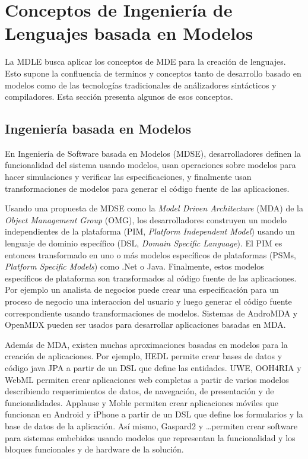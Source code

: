 

\section{Conceptos de Ingeniería de Lenguajes basada en Modelos}
\label{sec:conceptos}

La MDLE busca aplicar los conceptos de MDE para la creación de lenguajes.
Esto supone la confluencia de terminos y conceptos tanto de desarrollo basado en modelos como de las tecnologías tradicionales de análizadores sintácticos y compiladores.
Esta sección presenta algunos de esos conceptos.

\subsection{Ingeniería basada en Modelos}

En Ingeniería de Software basada en Modelos (MDSE), desarrolladores definen la funcionalidad del sistema usando modelos, 
usan operaciones sobre modelos para hacer simulaciones y verificar las especificaciones, 
y finalmente usan transformaciones de modelos para generar el código fuente de las aplicaciones.

Usando una propuesta de MDSE como la \textit{Model Driven Architecture} (MDA) de la \textit{Object Management Group} (OMG), 
los desarrolladores construyen un modelo independientes de la plataforma (PIM, \textit{Platform Independent Model})
usando un  lenguaje de dominio específico (DSL, \textit{Domain Specific Language}).
El PIM es entonces transformado en uno o más modelos específicos de plataformas (PSMs, \textit{Platform Specific Models}) como .Net o Java.
Finalmente, estos modelos específicos de plataforma son transformados al código fuente de las aplicaciones. 
Por ejemplo un analista de negocios puede crear una especificación para un proceso de negocio una interaccion del usuario y luego generar el código fuente correspondiente usando transformaciones de modelos.
Sistemas de AndroMDA y OpenMDX pueden ser usados para desarrollar aplicaciones basadas en MDA.

Además de MDA, existen muchas aproximaciones basadas en modelos para la creación de aplicaciones.
Por ejemplo, HEDL permite crear bases de datos y código java JPA a partir de un DSL que define las entidades.
UWE, OOH4RIA y WebML permiten crear aplicaciones web completas a partir de varios modelos describiendo requerimientos de datos, de navegación, de presentación y de funcionalidades.
Applause y Moble permiten crear aplicaciones móviles que funcionan en Android y iPhone a partir de un DSL que define los formularios y la base de datos de la aplicación. 
Así mismo, Gaspard2 y \ldots permiten crear software para sistemas embebidos usando modelos que representan la funcionalidad y los bloques funcionales y de hardware de la solución.

